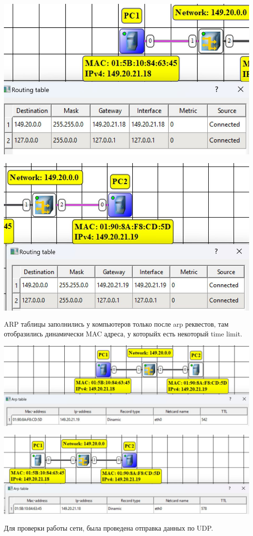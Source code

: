 \documentclass{article}
\begin{document}
\begin{minipage}{.5\textwidth}
    \includegraphics[width=.9\textwidth]{conc-2.jpg}
\end{minipage}
\hfill
\begin{minipage}{.5\textwidth}
    \includegraphics[width=.9\textwidth]{conc-3.jpg}
\end{minipage}

ARP таблицы заполнились у компьютеров только после arp реквестов, там отобразились динамически MAC адреса, у которыйх есть некоторый time limit.
\\
\begin{center}
    \includegraphics[width=.9\textwidth]{conc-6.jpg}
\end{center}
\begin{center}
    \includegraphics[width=.9\textwidth]{conc-7.jpg}
\end{center}
Для проверки работы сети, была проведена отправка данных по UDP.
\end{document}
